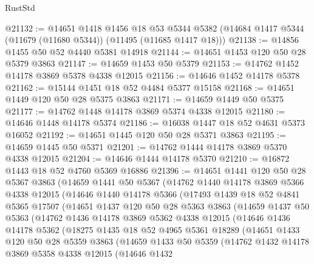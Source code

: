 \begin{lexlean}{RustStd}
\begin{coremodule}
@21132 := @14651
    @1418
    @1456
    @18
    @53
    @5344
    @5382
    (@14684 @1417 @5344 (@11679 (@11680 @5344)) (@11495 (@11685 @1417 @18)))
@21138 := @14856 @1455 @50 @52 @4440 @5381 @14918
@21144 := @14651 @1453 @120 @50 @28 @5379 @3863
@21147 := @14659 @1453 @50 @5379
@21153 := @14762 @1452 @14178 @3869 @5378 @4338 @12015
@21156 := @14646 @1452 @14178 @5378
@21162 := @15144 @1451 @18 @52 @4484 @5377 @15158
@21168 := @14651 @1449 @120 @50 @28 @5375 @3863
@21171 := @14659 @1449 @50 @5375
@21177 := @14762 @1448 @14178 @3869 @5374 @4338 @12015
@21180 := @14646 @1448 @14178 @5374
@21186 := @16038 @1447 @18 @52 @4631 @5373 @16052
@21192 := @14651 @1445 @120 @50 @28 @5371 @3863
@21195 := @14659 @1445 @50 @5371
@21201 := @14762 @1444 @14178 @3869 @5370 @4338 @12015
@21204 := @14646 @1444 @14178 @5370
@21210 := @16872 @1443 @18 @52 @4760 @5369 @16886
@21396 := @14651
    @1441
    @120
    @50
    @28
    @5367
    @3863
    (@14659
      @1441
      @50
      @5367
      (@14762
        @1440
        @14178
        @3869
        @5366
        @4338
        @12015
        (@14646
          @1440
          @14178
          @5366
          (@17493
            @1439
            @18
            @52
            @4841
            @5365
            @17507
            (@14651
              @1437
              @120
              @50
              @28
              @5363
              @3863
              (@14659
                @1437
                @50
                @5363
                (@14762
                  @1436
                  @14178
                  @3869
                  @5362
                  @4338
                  @12015
                  (@14646
                    @1436
                    @14178
                    @5362
                    (@18275
                      @1435
                      @18
                      @52
                      @4965
                      @5361
                      @18289
                      (@14651
                        @1433
                        @120
                        @50
                        @28
                        @5359
                        @3863
                        (@14659
                          @1433
                          @50
                          @5359
                          (@14762
                            @1432
                            @14178
                            @3869
                            @5358
                            @4338
                            @12015
                            (@14646
                              @1432

\end{coremodule}
\end{lexlean}
